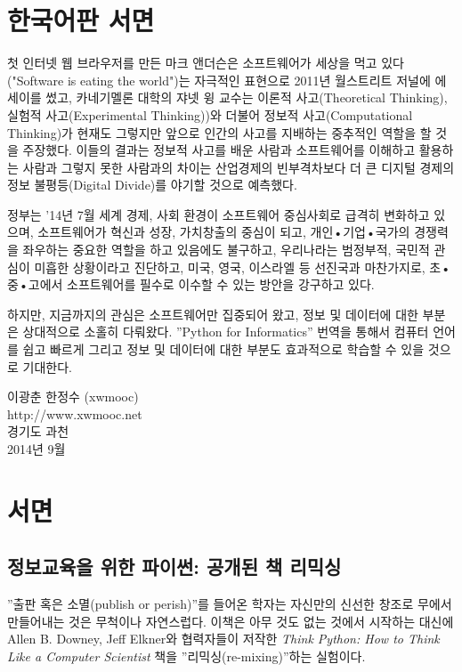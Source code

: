 
\chapter{한국어판 서면}

첫 인터넷 웹 브라우저를 만든 마크 앤더슨은 소프트웨어가 세상을 먹고 있다("Software is eating the world")는 자극적인 표현으로 2011년 월스트리트 저널에 에세이를 썼고, 카네기멜론 대학의 쟈넷 윙 교수는 이론적 사고(Theoretical Thinking), 실험적 사고(Experimental Thinking))와 더불어 정보적 사고(Computational Thinking)가 현재도 그렇지만 앞으로 인간의 사고를 지배하는 중추적인 역할을 할 것을 주장했다. 이들의 결과는 정보적 사고를 배운 사람과 소프트웨어를 이해하고 활용하는 사람과 그렇지 못한 사람과의 차이는 산업경제의 빈부격차보다 더 큰 디지털 경제의 정보 불평등(Digital Divide)를 야기할 것으로 예측했다.

정부는  ’14년 7월 세계 경제, 사회 환경이 소프트웨어 중심사회로 급격히 변화하고 있으며, 소프트웨어가 혁신과 성장, 가치창출의 중심이 되고, 개인•기업•국가의 경쟁력을 좌우하는 중요한 역할을 하고 있음에도 불구하고, 우리나라는 범정부적, 국민적 관심이 미흡한 상황이라고 진단하고, 미국, 영국, 이스라엘 등 선진국과 마찬가지로, 초•중•고에서 소프트웨어를 필수로 이수할 수 있는 방안을 강구하고 있다.

하지만, 지금까지의 관심은 소프트웨어만 집중되어 왔고, 정보 및 데이터에 대한 부분은 상대적으로 소홀히 다뤄왔다. 
''Python for Informatics'' 번역을 통해서 컴퓨터 언어를 쉽고 빠르게 그리고 정보 및 데이터에 대한 부분도 효과적으로 학습할 수 있을 것으로 기대한다.

이광춘 한정수 (xwmooc)\\
http://www.xwmooc.net\\
경기도 과천\\
2014년 9월

\chapter{서면}

\section*{정보교육을 위한 파이썬: 공개된 책 리믹싱}
''출판 혹은 소멸(publish or perish)''를 들어온 학자는 자신만의 신선한 창조로 무에서 만들어내는 것은 무척이나 자연스럽다.
이책은 아무 것도 없는 것에서 시작하는 대신에 Allen B. Downey, Jeff Elkner와 협력자들이 저작한 \emph{Think Python: How to Think Like
a Computer Scientist} 책을 ''리믹싱(re-mixing)''하는 실험이다.

